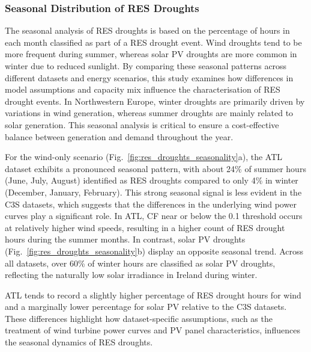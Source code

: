 \documentclass[preprint, 12pt]{elsarticle}
\begin{document}
\subsubsection{Seasonal Distribution of RES Droughts}

The seasonal analysis of RES droughts is based on the percentage of hours in each month classified as part of a RES drought event. Wind droughts tend to be more frequent during summer, whereas solar PV droughts are more common in winter due to reduced sunlight. By comparing these seasonal patterns across different datasets and energy scenarios, this study examines how differences in model assumptions and capacity mix influence the characterisation of RES drought events. In Northwestern Europe, winter droughts are primarily driven by variations in wind generation, whereas summer droughts are mainly related to solar generation. This seasonal analysis is critical to ensure a cost-effective balance between generation and demand throughout the year.

For the wind-only scenario (Fig.~\ref{fig:res_droughts_seasonality}a), the ATL dataset exhibits a pronounced seasonal pattern, with about 24\% of summer hours (June, July, August) identified as RES droughts compared to only 4\% in winter (December, January, February). This strong seasonal signal is less evident in the C3S datasets, which suggests that the differences in the underlying wind power curves play a significant role. In ATL, CF near or below the 0.1 threshold occurs at relatively higher wind speeds, resulting in a higher count of RES drought hours during the summer months. In contrast, solar PV droughts (Fig.~\ref{fig:res_droughts_seasonality}b) display an opposite seasonal trend. Across all datasets, over 60\% of winter hours are classified as solar PV droughts, reflecting the naturally low solar irradiance in Ireland during winter. 

ATL tends to record a slightly higher percentage of RES drought hours for wind and a marginally lower percentage for solar PV relative to the C3S datasets. These differences highlight how dataset-specific assumptions, such as the treatment of wind turbine power curves and PV panel characteristics, influences the seasonal dynamics of RES droughts.
\end{document}
